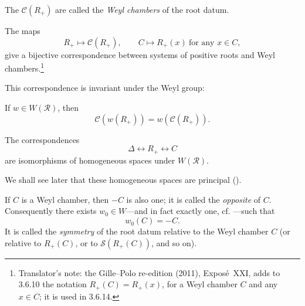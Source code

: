 \begin{definition}\label{sga3:XXI:3.6.10}
The \(\mathcal{C}(R_+)\) are called the \emph{Weyl chambers} of the
root datum.
\end{definition}

\begin{corollary}\label{sga3:XXI:3.6.11}
The maps
\[
 R_+\longmapsto\mathcal{C}(R_+),
 \qquad
 C\longmapsto R_+(x)\ \text{for any }x\in C,
\]
give a bijective correspondence between systems of positive roots
and Weyl chambers.\footnote{Translator's note: the Gille--Polo re-edition (2011), Exposé~XXI, adds to 3.6.10 the notation
\(R_+(C)=R_+(x)\), for a Weyl chamber \(C\) and any \(x\in C\); it is used in 3.6.14.}
\end{corollary}

This correspondence is invariant under the Weyl group:

\begin{lemma}\label{sga3:XXI:3.6.12}
If \(w\in W(\mathcal{R})\), then
\[
 \mathcal{C}(w(R_+))=w(\mathcal{C}(R_+)).
\]
\end{lemma}

\begin{corollary}\label{sga3:XXI:3.6.13}
The correspondences
\[
 \Delta\longleftrightarrow R_+\longleftrightarrow C
\]
are isomorphisms of homogeneous spaces under \(W(\mathcal{R})\).
\end{corollary}

We shall see later that these homogeneous spaces are principal
().

\begin{remark}\label{sga3:XXI:3.6.14}
If \(C\) is a Weyl chamber, then \(-C\) is also one; it is called the
\emph{opposite} of \(C\). Consequently there exists
\(w_0\in W\)---and in fact exactly one, cf.
---such that
\[
 w_0(C)=-C.
\]
It is called the \emph{symmetry} of the root datum relative to the
Weyl chamber \(C\) (or relative to \(R_+(C)\), or to
\(\mathscr{S}(R_+(C))\), and so on).
\end{remark}
